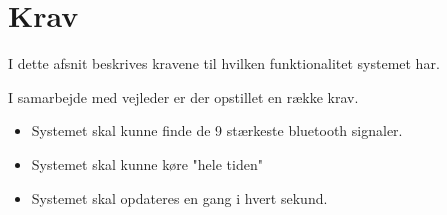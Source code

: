 \graphicspath{{Chapters/Krav/}}


\section{Krav}
I dette afsnit beskrives kravene til hvilken funktionalitet systemet har. 


I samarbejde med vejleder er der opstillet en række krav.
\begin{itemize}
\item Systemet skal kunne finde de 9 stærkeste bluetooth signaler. 
\item Systemet skal kunne køre "hele tiden"
\item Systemet skal opdateres en gang i hvert sekund.  
\end{itemize}

